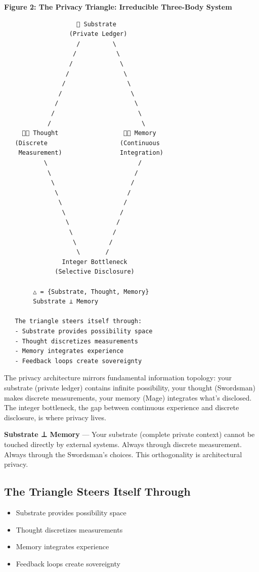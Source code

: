 \documentclass[
  11pt,
]{article}
\begin{document}
\textbf{Figure 2: The Privacy Triangle: Irreducible Three-Body System}

\begin{verbatim}
                    🌳 Substrate
                  (Private Ledger)
                    /         \
                   /           \
                  /             \
                 /               \
                /                 \
               /                   \
              /                     \
             /                       \
            /                         \
     🦅💭 Thought                  🦅🧠 Memory
   (Discrete                    (Continuous
    Measurement)                Integration)
           \                         /
            \                       /
             \                     /
              \                   /
               \                 /
                \               /
                 \             /
                  \           /
                   \         /
                    \       /
                Integer Bottleneck
              (Selective Disclosure)

        △ = {Substrate, Thought, Memory}
        Substrate ⊥ Memory

   The triangle steers itself through:
   - Substrate provides possibility space
   - Thought discretizes measurements
   - Memory integrates experience
   - Feedback loops create sovereignty
\end{verbatim}

The privacy architecture mirrors fundamental information topology: your
substrate (private ledger) contains infinite possibility, your thought
(Swordsman) makes discrete measurements, your memory (Mage) integrates
what's disclosed. The integer bottleneck, the gap between continuous
experience and discrete disclosure, is where privacy lives.

\textbf{Substrate ⊥ Memory} --- Your substrate (complete private
context) cannot be touched directly by external systems. Always through
discrete measurement. Always through the Swordsman's choices. This
orthogonality is architectural privacy.

\subsection{The Triangle Steers Itself
Through}\label{the-triangle-steers-itself-through}

\begin{itemize}
\item
  Substrate provides possibility space
\item
  Thought discretizes measurements
\item
  Memory integrates experience
\item
  Feedback loops create sovereignty
\end{itemize}
\end{document}
